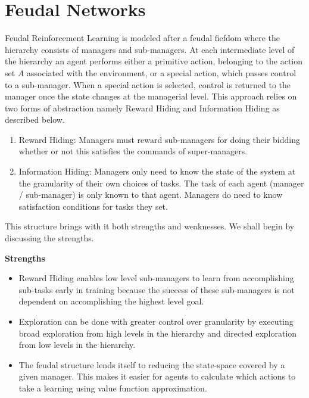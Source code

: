 \section{Feudal Networks}

Feudal Reinforcement Learning is modeled after a feudal fiefdom where the hierarchy consists
of managers and sub-managers. At each intermediate level of the hierarchy an agent performs
either a primitive action, belonging to the action set $A$ associated with the environment, or
a special action, which passes control to a sub-manager. When a special action is selected, control is
returned to the manager once the state changes at the managerial level. This approach relies on two
forms of abstraction namely Reward Hiding and Information Hiding as described below.

\begin{enumerate}
    \item Reward Hiding: Managers must reward sub-managers for doing their bidding whether or not this
          satisfies the commands of super-managers.
    \item Information Hiding: Managers only need to know the state of the system at the granularity of
          their own choices of tasks. The task of each agent (manager / sub-manager) is only known to that
          agent. Managers do need to know satisfaction conditions for tasks they set.
\end{enumerate}

This structure brings with it both strengths and weaknesses. We shall begin by discussing the strengths.

\textbf{Strengths}
\begin{itemize}
    \item Reward Hiding enables low level sub-managers to learn from accomplishing sub-tasks early in training
          because the success of these sub-managers is not dependent on accomplishing the highest level goal.
    \item Exploration can be done with greater control over granularity by executing broad exploration from high levels
          in the hierarchy and directed exploration from low levels in the hierarchy.
    \item The feudal structure lends itself to reducing the state-space covered by a given manager.
          This makes it easier for agents to calculate which actions to take a learning using value function approximation.
\end{itemize}

